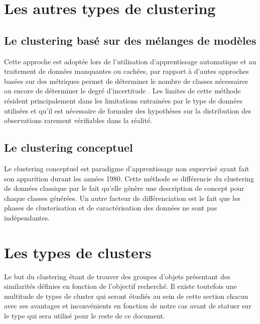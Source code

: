 \documentclass[memoire.tex]{subfiles}
\begin{document}
\section{Les autres types de clustering}
\subsection{Le clustering basé sur des mélanges de modèles}
Cette approche est adoptée lors de l'utilisation d'apprentissage automatique et au traitement de données manquantes ou cachées, par rapport à d'autes approches basées sur des métriques permet de déterminer le nombre de classes nécessaires  ou encore de déterminer le degré d'incertitude \cite{ref10}. Les limites de cette méthode résident principalement dans les limitations entrainées par le type de données utilisées et qu'il est nécessaire de formuler des hypothèses sur la distribution des observations rarement vérifiables dans la réalité.\cite{ref8}

\subsection{Le clustering conceptuel}
Le clustering conceptuel est paradigme d'apprentissage non supervisé ayant fait son apparition durant les années 1980. Cette méthode se différencie du clustering de données classique par le fait qu'elle génère une description de concept pour chaque classes générées. Un autre facteur de différenciation est le fait que les phases de clusterisation et de caractérisation des données ne sont pas indépendantes.\cite{ref11}


\section{Les types de clusters}

Le but du clustering étant de trouver des groupes d'objets présentant des similarités
définies en fonction de l'objectif recherché. Il existe toutefois une multitude de types de cluster qui seront étudiés au sein de cette section chacun avec ses avantages et inconvénients en fonction de notre cas avant de statuer sur le type qui sera utilisé pour le reste de ce document.
\end{document}
